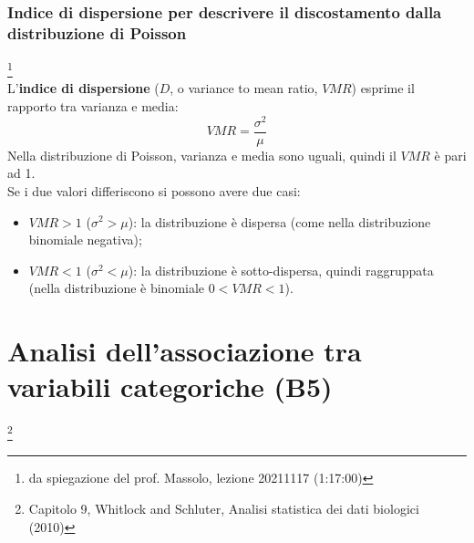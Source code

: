 \documentclass[10pt, draft]{book}
\newcommand{\tightlist}{%
\setlength{\itemsep}{1pt}\setlength{\parskip}{0pt}\setlength{\parsep}{0pt}}
\begin{document}
\subsection{Indice di dispersione per descrivere il discostamento dalla distribuzione di Poisson}\footnote{da spiegazione del prof. Massolo, lezione 20211117 (1:17:00)}
\\
L'\textbf{indice di dispersione} ($D$, o variance to mean ratio, $VMR$) esprime il rapporto tra varianza e media:
\begin{equation}
VMR = \frac{\sigma^2}{\mu}
\end{equation}
Nella distribuzione di Poisson, varianza e media sono uguali, quindi il $VMR$ è pari ad 1.
\\
Se i due valori differiscono si possono avere due casi:
\begin{itemize} \tightlist
    \item $VMR > 1$ ($\sigma^2 > \mu$): la distribuzione è dispersa (come nella distribuzione binomiale negativa);
    \item $VMR < 1$ ($\sigma^2 < \mu$): la distribuzione è sotto-dispersa, quindi raggruppata (nella distribuzione è binomiale $0 < VMR < 1$).
\end{itemize}

\chapter{Analisi dell'associazione tra variabili categoriche (B5)}\footnote{Capitolo 9, Whitlock and Schluter, Analisi statistica dei dati biologici (2010)}
\end{document}
